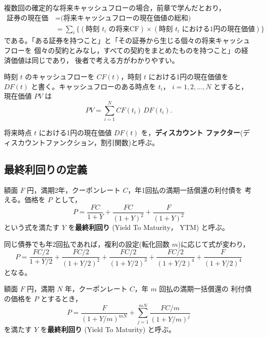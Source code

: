 複数回の確定的な将来キャッシュフローの場合，前章で学んだとおり，
\begin{align*}
\text{証券の現在価値}
&= \text{(将来キャッシュフローの現在価値の総和)}\\
&= \sum_i \bigl\{(\text{時刻 } t_i \text{ の将来CF}) \times
(\text{時刻 } t_i \text{ における1円の現在価値})\bigr\}
\end{align*}
である。「ある証券を持つこと」と「その証券から生じる個々の将来キャッシュフローを
個々の契約とみなし，すべての契約をまとめたものを持つこと」の経済価値は同じであり，
後者で考える方がわかりやすい。

時刻 $t$ のキャッシュフローを $CF(t)$，時刻 $t$ における1円の現在価値を
$DF(t)$ と書く。キャッシュフローのある時点を $t_i$， $i=1,2,\dots,N$ とすると，
現在価値 $PV$ は
\begin{equation}
PV = \sum_{i=1}^{N} CF(t_i)\, DF(t_i).
\label{eq:pv-df}
\end{equation}

\begin{definition}[ディスカウントファクター]
将来時点 $t$ における1円の現在価値 $DF(t)$ を，\textbf{ディスカウント
ファクター}(ディスカウントファンクション，割引関数)と呼ぶ。
\end{definition}

\vspace{18pt}

\subsection{最終利回りの定義}

額面 $F$ 円，満期2年，クーポンレート $C$，年1回払の満期一括償還の利付債を
考える。価格を $P$ として，
\begin{equation}
P = \frac{FC}{1+Y} + \frac{FC}{(1+Y)^2} + \frac{F}{(1+Y)^2}
\end{equation}
という式を満たす $Y$ を\textbf{最終利回り} (Yield To Maturity， YTM) と呼ぶ。

同じ債券でも年2回払であれば，複利の設定(転化回数 $m$)に応じて式が変わり，
\begin{equation}
P = \frac{FC/2}{1+Y/2} + \frac{FC/2}{(1+Y/2)^2} + \frac{FC/2}{(1+Y/2)^3}
+ \frac{FC/2}{(1+Y/2)^4} + \frac{F}{(1+Y/2)^4}
\end{equation}
となる。

\begin{definition}
額面 $F$ 円，満期 $N$ 年，クーポンレート $C$，年 $m$ 回払の満期一括償還の
利付債の価格を $P$ とするとき，
\begin{equation}
P = \frac{F}{(1+Y/m)^{mN}} + \sum_{j=1}^{mN}\frac{FC/m}{(1+Y/m)^{j}}
\label{eq:ytm-def}
\end{equation}
を満たす $Y$ を\textbf{最終利回り} (Yield To Maturity) と呼ぶ。
\end{definition}

